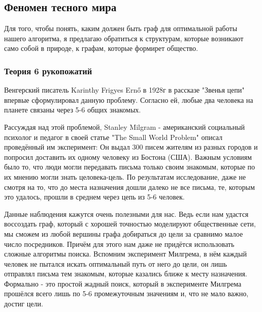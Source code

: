\subsection{Феномен тесного мира}

Для того, чтобы понять, каким должен быть граф для 
оптимальной работы нашего алгоритма, я предлагаю обратиться
к структурам, которые возникают само собой в приро\-де, 
к графам, которые формирет общество.

\subsubsection{Теория 6 рукопожатий}

Венгерский писатель Karinthy Frigyes Ernő в 1928г в рассказе 
"Звенья цепи" впервые сформулировал данную проблему. Согласно ей, 
любые два человека на планете связаны через 5-6 общих знакомых.

Рассуждая над этой проблемой, Stanley Milgram - американский 
социальный психолог и педагог в своей статье "The Small World Problem" \cite{Milgram}
описал проведённый им эксперимент: 
Он выдал 300 писем жителям из разных городов и попросил доставить 
их одному человеку из Бостона (США). Важным условиям было то, что
люди могли передавать письма только своим знакомым, которые по их
мнению могли знать целовека-цель.
По результатам исследование, даже не смотря на то, что до места назначения
дошли далеко не все письма, те, которым это удалось, прошли в среднем через цепь из
5-6 человек. 

Данные наблюдения кажутся очень полезными для нас. Ведь если нам
удастся воссоздать граф, который с хорошей точностью моделируют
общественные сети, мы сможем из любой вершины графа добираться до 
цели за сравнимо малое число посредников. Причём для этого нам даже 
не придётся использовать сложные алгоритмы поиска. Вспомним эксперимент
Милгрема, в нём каждый человек не пытался искать оптимальный путь
от него до цели, он лишь отправлял письма тем знакомым, которые казались
ближе к месту назначения. Формально - это простой жадный поиск, который
в эксперименте Милгрема прошёлся всего лишь по 5-6 промежуточным значениям
и, что не мало важно, достиг цели.



